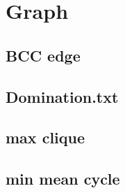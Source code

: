 \section{Graph}
		
	\subsection{BCC edge}
		
%       
%		
	\subsection{Domination.txt}
		
%		
%		
%		
	\subsection{max clique}
		
	\subsection{min mean cycle}
		
%		
%		
